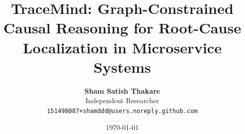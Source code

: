 \documentclass[10pt,twocolumn,letterpaper]{article}
\title{\textbf{TraceMind: Graph-Constrained Causal Reasoning for Root-Cause Localization in Microservice Systems}}
\author{
\textbf{Sham Satish Thakare}\\
Independent Researcher\\
{\tt\small 151498087+shamddd@users.noreply.github.com}
}
\date{\today}
\begin{document}
\maketitle

\begin{abstract}

\end{abstract}












\end{document}
